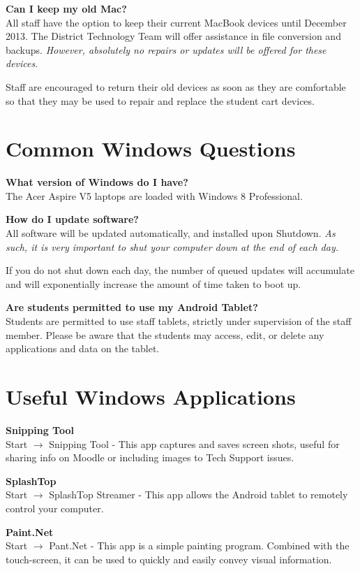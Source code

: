 \documentclass[10pt,foldmark,notumble]{leaflet}
\begin{document}
\textbf{Can I keep my old Mac?}\\
All staff have the option to keep their current MacBook devices until December 2013. The District Technology Team will offer assistance in file conversion and backups. \emph{However, absolutely no repairs or updates will be offered for these devices}. 

Staff are encouraged to return their old devices as soon as they are comfortable so that they may be used to repair and replace the student cart devices.

\section{Common Windows Questions\color{red}\hrulefill\color{black}}
\textbf{What version of Windows do I have?}\\
The Acer Aspire V5 laptops are loaded with Windows 8 Professional. 

\textbf{How do I update software?}\\
All software will be updated automatically, and installed upon Shutdown. \emph{As such, it is very important to shut your computer down at the end of each day.}

If you do not shut down each day, the number of queued updates will accumulate and will exponentially increase the amount of time taken to boot up.

\textbf{Are students permitted to use my Android Tablet?}\\
Students are permitted to use staff tablets, strictly under supervision of the staff member. Please be aware that the students may access, edit, or delete any applications and data on the tablet.

\section{Useful Windows Applications\color{red}\hrulefill\color{black}}
\textbf{Snipping Tool}\\
Start $\to$ Snipping Tool - This app captures and saves screen shots, useful for sharing info on Moodle or including images to Tech Support issues.

\textbf{SplashTop}\\
Start $\to$ SplashTop Streamer - This app allows the Android tablet to remotely control your computer.

\textbf{Paint.Net}\\
Start $\to$ Pant.Net - This app is a simple painting program. Combined with the touch-screen, it can be used to quickly and easily convey visual information.
\end{document}
